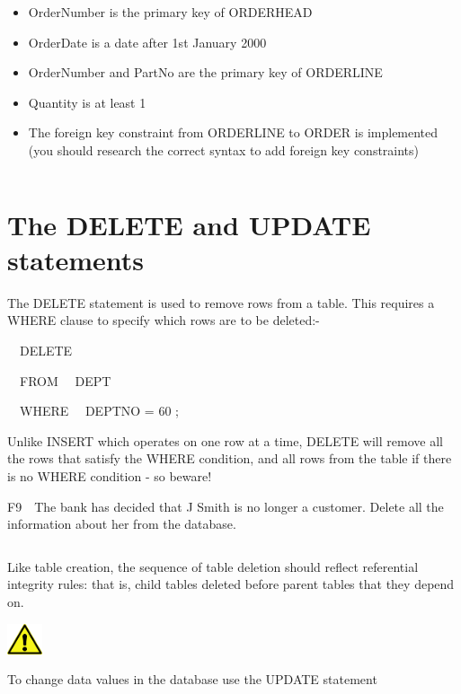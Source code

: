 \begin{itemize}
\item OrderNumber is the primary key of ORDERHEAD
\item OrderDate is a date after 1st January 2000
\item OrderNumber and PartNo are the primary key of ORDERLINE
\item Quantity is at least 1
\item The foreign key constraint from ORDERLINE to ORDER is implemented (you should research the correct syntax to add foreign key constraints) 
\end{itemize}
\begin{flushleft}
\tablefirsthead{}
\tablehead{}
\tabletail{}
\tablelasttail{}
\begin{supertabular}{|m{14.663cm}|}
\hline
\\\hline
\end{supertabular}
\end{flushleft}

\section{The DELETE and UPDATE statements}
The DELETE statement is used to remove rows from a table.  This requires a WHERE clause to specify which rows are to be deleted:-

\ \ DELETE 

\ \ FROM \ \ DEPT

\ \ WHERE \ \ DEPTNO = 60 ;

Unlike INSERT which operates on one row at a time, DELETE will remove all the rows that satisfy the WHERE condition, and all rows from the table if there is no WHERE condition - so beware!

F9\ \ The bank has decided that J Smith is no longer a customer.  Delete all the information about her from the database.

\begin{flushleft}
\tablefirsthead{}
\tablehead{}
\tabletail{}
\tablelasttail{}
\begin{supertabular}{|m{14.663cm}|}
\hline
\\\hline
\end{supertabular}
\end{flushleft}
Like table creation, the sequence of table deletion should reflect referential integrity rules: that is, child tables deleted before parent tables that they depend on.

\begin{center}
  
\includegraphics[width=1.048cm,height=0.903cm]{images/img (2).png}

\end{center}
To change data values in the database use the UPDATE statement 

